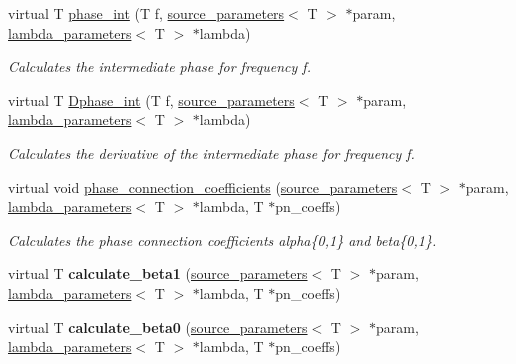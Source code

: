 \begin{DoxyCompactItemize}
virtual T \hyperlink{classIMRPhenomD_ad6a8bb9539e7494cad8a91aaa950cf50}{phase\+\_\+int} (T f, \hyperlink{structsource__parameters}{source\+\_\+parameters}$<$ T $>$ $\ast$param, \hyperlink{structlambda__parameters}{lambda\+\_\+parameters}$<$ T $>$ $\ast$lambda)
\begin{DoxyCompactList}\small\item\em Calculates the intermediate phase for frequency f. \end{DoxyCompactList}\item 
virtual T \hyperlink{classIMRPhenomD_a8d395e33bd420cdc996a6487302af36a}{Dphase\+\_\+int} (T f, \hyperlink{structsource__parameters}{source\+\_\+parameters}$<$ T $>$ $\ast$param, \hyperlink{structlambda__parameters}{lambda\+\_\+parameters}$<$ T $>$ $\ast$lambda)
\begin{DoxyCompactList}\small\item\em Calculates the derivative of the intermediate phase for frequency f. \end{DoxyCompactList}\item 
virtual void \hyperlink{classIMRPhenomD_a6847c2c48302ff863b9a93354e71afcc}{phase\+\_\+connection\+\_\+coefficients} (\hyperlink{structsource__parameters}{source\+\_\+parameters}$<$ T $>$ $\ast$param, \hyperlink{structlambda__parameters}{lambda\+\_\+parameters}$<$ T $>$ $\ast$lambda, T $\ast$pn\+\_\+coeffs)
\begin{DoxyCompactList}\small\item\em Calculates the phase connection coefficients alpha\{0,1\} and beta\{0,1\}. \end{DoxyCompactList}\item 
\mbox{\label{classIMRPhenomD_a343638375f42abb5097f26ef3fe183ad}} 
virtual T {\bfseries calculate\+\_\+beta1} (\hyperlink{structsource__parameters}{source\+\_\+parameters}$<$ T $>$ $\ast$param, \hyperlink{structlambda__parameters}{lambda\+\_\+parameters}$<$ T $>$ $\ast$lambda, T $\ast$pn\+\_\+coeffs)
\item 
\mbox{\label{classIMRPhenomD_ac3c4886ba5fafea197b2c8be90a04e63}} 
virtual T {\bfseries calculate\+\_\+beta0} (\hyperlink{structsource__parameters}{source\+\_\+parameters}$<$ T $>$ $\ast$param, \hyperlink{structlambda__parameters}{lambda\+\_\+parameters}$<$ T $>$ $\ast$lambda, T $\ast$pn\+\_\+coeffs)
\item 
\mbox{\label{classIMRPhenomD_a5bcd7d9b753b0e6acc9c74618ae484ad}} 

\end{DoxyCompactItemize}
